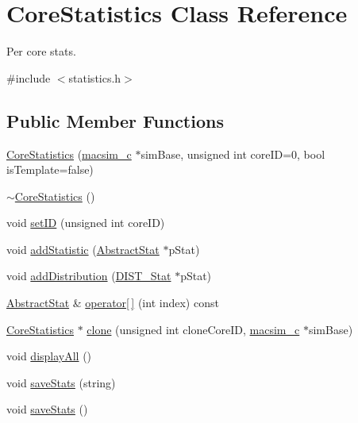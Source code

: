 \hypertarget{classCoreStatistics}{
\section{CoreStatistics Class Reference}
\label{classCoreStatistics}
}


Per core stats.  




{\ttfamily \#include $<$statistics.h$>$}

\subsection*{Public Member Functions}
\begin{DoxyCompactItemize}
\item 
\hyperlink{classCoreStatistics_ab482f3661ea116d7bb213be23f7fa750}{CoreStatistics} (\hyperlink{classmacsim__c}{macsim\_\-c} $\ast$simBase, unsigned int coreID=0, bool isTemplate=false)
\item 
\hyperlink{classCoreStatistics_a69e1ba5430d27e8169d7bcf4c8753a45}{$\sim$CoreStatistics} ()
\item 
void \hyperlink{classCoreStatistics_a7e1c8a6d069e2fba049745248e79777d}{setID} (unsigned int coreID)
\item 
void \hyperlink{classCoreStatistics_a1d824e0aa6094d476209b8ebc9eccc11}{addStatistic} (\hyperlink{classAbstractStat}{AbstractStat} $\ast$pStat)
\item 
void \hyperlink{classCoreStatistics_a8ff27cdfdf16d543f542386c0eb7c7af}{addDistribution} (\hyperlink{classDIST__Stat}{DIST\_\-Stat} $\ast$pStat)
\item 
\hyperlink{classAbstractStat}{AbstractStat} \& \hyperlink{classCoreStatistics_a93f4fbdfeb1a806ecb0fca44136df220}{operator\mbox{[}$\,$\mbox{]}} (int index) const 
\item 
\hyperlink{classCoreStatistics}{CoreStatistics} $\ast$ \hyperlink{classCoreStatistics_a3645316a2345ebab6e1f21072d53f1c8}{clone} (unsigned int cloneCoreID, \hyperlink{classmacsim__c}{macsim\_\-c} $\ast$simBase)
\item 
void \hyperlink{classCoreStatistics_adaff7217d1b9fedee4ff5f9f074c604e}{displayAll} ()
\item 
void \hyperlink{classCoreStatistics_ae519a2a0b2d422df32239883444f78ed}{saveStats} (string)
\item 
void \hyperlink{classCoreStatistics_a0d476a2629d8746036acdb081cb5f8e5}{saveStats} ()
\end{DoxyCompactItemize}
